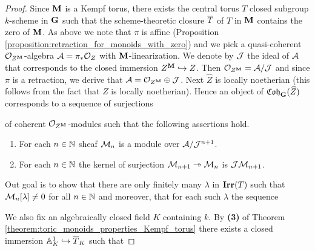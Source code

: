 \begin{proof}
Since $\mathbf{M}$ is a Kempf torus, there exists the central torus $T$ closed subgroup $k$-scheme in $\mathbf{G}$ such that the scheme-theoretic closure $\overline{T}$ of $T$ in $\mathbf{M}$ contains the zero of $\mathbf{M}$. As above we note that $\pi$ is affine (Proposition \ref{proposition:retraction_for_monoids_with_zero}) and we pick a quasi-coherent ${\mathcal O}_{Z^{\mathbf{M}}}$-algebra ${\mathcal A} = \pi_*{\mathcal O}_Z$ with $\mathbf{M}$-linearization. We denote by ${\mathcal J}$ the ideal of ${\mathcal A}$ that corresponds to the closed immersion $Z^{\mathbf{M}}\hookrightarrow Z$. Then ${\mathcal O}_{Z^{\mathbf{M}}} = {\mathcal A}/{\mathcal J}$ and since $\pi$ is a retraction, we derive that ${\mathcal A} = {\mathcal O}_{Z^{\mathbf{M}}}\oplus {\mathcal J}$. Next $\widehat{Z}$ is locally noetherian (this follows from the fact that $Z$ is locally noetherian). Hence an object of $\mathfrak{Coh}_{\mathbf{G}}(\widehat{Z})$ corresponds to a sequence of surjections
\begin{center}
\end{center}
of coherent ${\mathcal O}_{Z^{\mathbf{M}}}$-modules such that the following assertions hold.
\begin{enumerate}[label=\textbf{(\arabic*)}, leftmargin=1.5em]
\item For each $n\in {\mathbb N}$ sheaf ${\mathcal M}_n$ is a module over ${\mathcal A}/{\mathcal J}^{n+1}$.
\item For each $n\in {\mathbb N}$ the kernel of surjection ${\mathcal M}_{n+1}\twoheadrightarrow {\mathcal M}_n$ is ${\mathcal J}{\mathcal M}_{n+1}$.
\end{enumerate}
 Out goal is to show that there are only finitely many $\lambda$ in $\mathbf{Irr}(T)$ such that ${\mathcal M}_n[\lambda]\neq 0$ for all $n\in {\mathbb N}$ and moreover, that for each such $\lambda$ the sequence
\begin{center}
\end{center}
We also fix an algebraically closed field $K$ containing $k$. By \textbf{(3)} of Theorem \ref{theorem:toric_monoids_properties_Kempf_torus} there exists a closed immersion $\mathbb{A}^1_K\hookrightarrow \overline{T}_K$ such that 
\end{proof}

